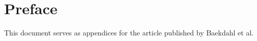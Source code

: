 \section*{Preface}
This document serves as appendices for the article published by Baekdahl et al. \cite{hyggekaffe}